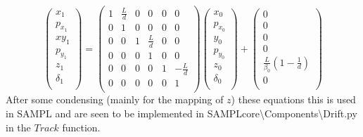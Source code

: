 \documentclass[11pt,a4paper]{article}
\begin{document}
	\[
	\begin{pmatrix}
	x_1\\ p_{x_1}\\ xy_1\\ p_{y_1}\\ z_1\\ \delta_1\\
	\end{pmatrix}
	=
	\begin{pmatrix}
	1 & \frac{L}{d} & 0 & 0 & 0 & 0\\
	0 & 1 & 0 & 0 & 0 & 0\\
	0 & 0 & 1 &\frac{L}{d} & 0 & 0\\
	0 & 0 & 0 & 1 & 0 & 0\\
	0 & 0 & 0 & 0 & 1 & -\frac{L}{d}\\
	0 & 0 & 0 & 0 & 0 & 1\\
	\end{pmatrix}
	\begin{pmatrix}
	x_0\\ p_{x_0}\\ y_0\\ p_{y_0}\\ z_0\\ \delta_0\\
	\end{pmatrix}
	+
	\begin{pmatrix}
	0\\ 0\\ 0\\ 0\\ \frac{L}{\beta_0}(1-\frac{1}{d})\\ 0\\
	\end{pmatrix}	
	\]
	After some condensing (mainly for the mapping of $z$) these equations this is used in SAMPL and are seen to be implemented in SAMPLcore\textbackslash Components\textbackslash Drift.py in the $Track$ function.
\end{document}
